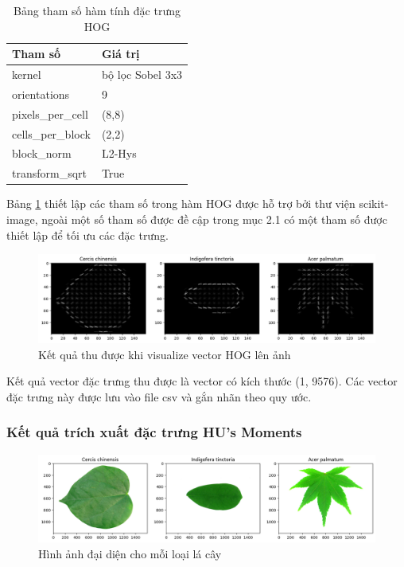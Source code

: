 \documentclass[a4paper]{article}
\begin{document}
\begin{table}[h]
    \centering
    \caption{Bảng tham số hàm tính đặc trưng HOG}
    \label{tab:hog_parameter}
    \bigskip
    \begin{tabular}{|p{4cm}|p{4cm}|}
        \hline
        \textbf{Tham số} & \textbf{Giá trị} \\ \hline
        kernel & bộ lọc Sobel 3x3 \\ \hline
        orientations & 9 \\ \hline
        pixels\_per\_cell & (8,8) \\ \hline
        cells\_per\_block & (2,2) \\ \hline
        block\_norm & L2-Hys \\ \hline
        transform\_sqrt & True \\ \hline
    \end{tabular}
\end{table}
Bảng \ref{tab:hog_parameter} thiết lập các tham số trong hàm HOG được hỗ trợ bởi thư viện scikit-image, ngoài một số tham số được đề cập trong mục 2.1 có một tham số được thiết lập để tối ưu các đặc trưng. 
\begin{figure}
    \centering
    \includegraphics[width=0.85\linewidth]{images/hog3.png}
    \caption{Kết quả thu được khi visualize vector HOG lên ảnh}
    \label{fig:hog3}
\end{figure}

Kết quả vector đặc trưng thu được là vector có kích thước (1, 9576). Các vector đặc trưng này được lưu vào file csv và gắn nhãn theo quy ước.
\subsubsection{Kết quả trích xuất đặc trưng HU's Moments}
\begin{figure}
    \centering
    \includegraphics[width=1\linewidth]{images/hu1.png}
    \caption{Hình ảnh đại diện cho mỗi loại lá cây}
    \label{fig:hu1}
\end{figure}
\end{document}
